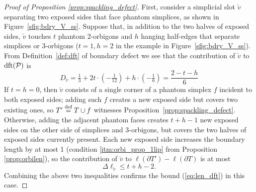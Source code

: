 \documentclass{amsart}
\newcommand{\defeq}{\stackrel{\tn{def}}{=}}
\newcommand{\dft}{\textnormal{dft}}
\newcommand{\tn}{\textnormal}
\begin{document}
\begin{proof}[Proof of Proposition \ref{prop:spackling_defect}]
First, consider a simplicial slot $\check{v}$ separating two exposed sides that face phantom simplices, as shown in Figure~\ref{sfig:bdry_V_ss}. Suppose that, in addition to the two halves of exposed sides, $\check{v}$ touches $t$ phantom 2-orbigons and $h$ hanging half-edges that separate simplices or 3-orbigons ($t=1,h=2$ in the example in Figure~\ref{sfig:bdry_V_ss}). From Definition~\ref{def:dft} of boundary defect we see that the contribution of $\check{v}$ to $\dft(\mathcal{P})$ is
\begin{equation*}
D_{\check{v}}=\tfrac{1}{3}+2t\cdot(-\tfrac{1}{12})+h\cdot(-\tfrac{1}{6})=\frac{2-t-h}{6}
\end{equation*}
If $t=h=0$, then $\check{v}$ consists of a single corner of a phantom simplex $f$ incident to both exposed sides; adding such $f$ creates a new exposed side but covers two existing ones, so $T'\defeq T\cup f$ witnesses Proposition~\ref{prop:spackling_defect}. Otherwise, adding the adjacent phantom faces creates $t+h-1$ new exposed sides on the other side of simplices and 3-orbigons, but covers the two halves of exposed sides currently present. Each new exposed side increases the boundary length by at most 1 (condition \ref*{itm:orbi_prop_1lip} from Proposition \ref{prop:orbilen}), so the contribution of $\check{v}$ to $\ell(\partial T')-\ell(\partial T)$ is at most
\begin{equation*}
\Delta\ell_{\check{v}}\leqslant t+h-2.
\end{equation*}
Combining the above two inequalities confirms the bound (\ref{eq:len_dft}) in this case.


\end{proof}
\end{document}
